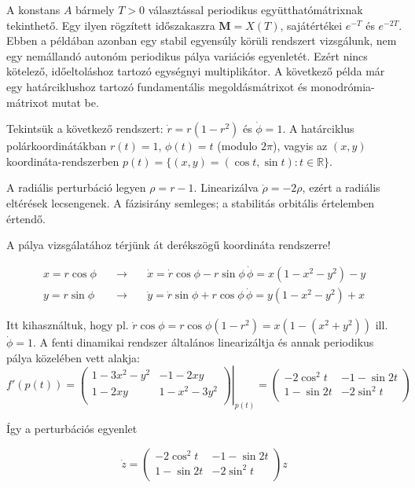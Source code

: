 A konstans $A$ bármely $T>0$ választással periodikus együtthatómátrixnak tekinthető. Egy ilyen rögzített időszakaszra $\mathbf M=X(T)$, sajátértékei $e^{-T}$ és $e^{-2T}$. Ebben a példában azonban egy stabil egyensúly körüli rendszert vizsgálunk, nem egy nemállandó autonóm periodikus pálya variációs egyenletét. Ezért nincs kötelező, időeltoláshoz tartozó egységnyi multiplikátor. A következő példa már egy határciklushoz tartozó fundamentális megoldásmátrixot és monodrómia-mátrixot mutat be.
\exampleend

 Tekintsük a következő rendszert: $\dot{r}=r (1-r^2)$ és $\dot{\phi} = 1$. A határciklus polárkoordinátákban $r(t)=1$, $\phi(t)=t$ (modulo $2\pi$), vagyis az $(x,y)$ koordináta-rendszerben $p(t) = \{(x,y)=(\cos t,\sin t):t\in\mathbb{R}\}$.

A radiális perturbáció legyen $\rho=r-1$. Linearizálva $\dot{\rho}=-2\rho$, ezért a radiális eltérések lecsengenek. A fázisirány semleges; a stabilitás orbitális értelemben értendő.

A pálya vizsgálatához térjünk át derékszögű koordináta rendszerre!

\begin{align}
x=r\cos \phi& \quad \rightarrow \quad & \dot{x}=\dot{r} \cos \phi-r \sin\phi\, \dot{\phi}=x\left(1-x^2-y^2\right)-y\\
y=r\sin \phi& \quad \rightarrow \quad & \dot{y}=\dot{r} \sin \phi+r \cos\phi\, \dot{\phi}=y\left(1-x^2-y^2\right)+x
\end{align}

Itt kihasználtuk, hogy pl. $\dot{r}\cos \phi=r\cos\phi(1-r^2)=x(1-(x^2+y^2))$ ill. $\dot{\phi}=1$. A fenti dinamikai rendszer  általános linearizáltja és annak periodikus pálya közelében vett alakja:
\begin{equation}
f'(p(t)) = \left. \begin{pmatrix}
1-3x^2-y^2 & -1-2xy \\
1-2xy & 1-x^2-3y^2 \\
\end{pmatrix} \right|_{p(t)}=
\begin{pmatrix}
-2\cos^2t & -1-\sin 2t \\
1-\sin 2t & -2\sin^2t \\
\end{pmatrix}
\end{equation}

Így a perturbációs egyenlet

\begin{equation}
\dot{z}=\begin{pmatrix}
-2\cos^2t & -1-\sin 2t \\
1-\sin 2t & -2\sin^2t \\
\end{pmatrix} z
\end{equation}

